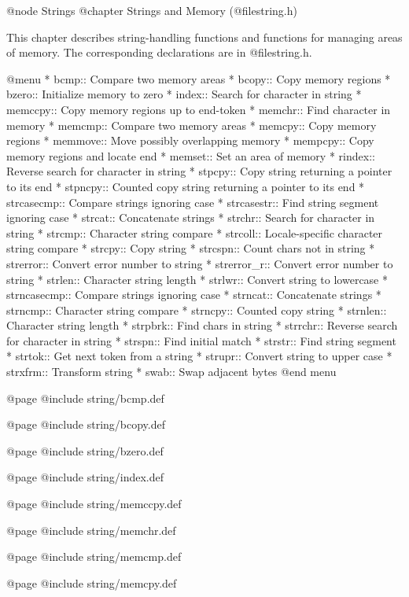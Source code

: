 @node Strings
@chapter Strings and Memory (@file{string.h})

This chapter describes string-handling functions and functions for
managing areas of memory.  The corresponding declarations are in
@file{string.h}.

@menu
* bcmp::        Compare two memory areas
* bcopy::       Copy memory regions
* bzero::       Initialize memory to zero
* index::       Search for character in string
* memccpy::     Copy memory regions up to end-token
* memchr::      Find character in memory
* memcmp::      Compare two memory areas
* memcpy::      Copy memory regions
* memmove::     Move possibly overlapping memory
* mempcpy::	Copy memory regions and locate end
* memset::      Set an area of memory
* rindex::      Reverse search for character in string
* stpcpy::      Copy string returning a pointer to its end
* stpncpy::     Counted copy string returning a pointer to its end
* strcasecmp::	Compare strings ignoring case
* strcasestr::	Find string segment ignoring case
* strcat::      Concatenate strings
* strchr::      Search for character in string
* strcmp::      Character string compare
* strcoll::     Locale-specific character string compare
* strcpy::      Copy string
* strcspn::     Count chars not in string
* strerror::    Convert error number to string
* strerror_r::  Convert error number to string
* strlen::      Character string length
* strlwr::	Convert string to lowercase
* strncasecmp::	Compare strings ignoring case
* strncat::     Concatenate strings
* strncmp::     Character string compare
* strncpy::     Counted copy string
* strnlen::     Character string length
* strpbrk::     Find chars in string
* strrchr::     Reverse search for character in string
* strspn::      Find initial match
* strstr::      Find string segment
* strtok::      Get next token from a string
* strupr::	Convert string to upper case
* strxfrm::     Transform string
* swab::        Swap adjacent bytes
@end menu

@page
@include string/bcmp.def

@page
@include string/bcopy.def

@page
@include string/bzero.def

@page
@include string/index.def

@page
@include string/memccpy.def

@page
@include string/memchr.def

@page
@include string/memcmp.def

@page
@include string/memcpy.def


